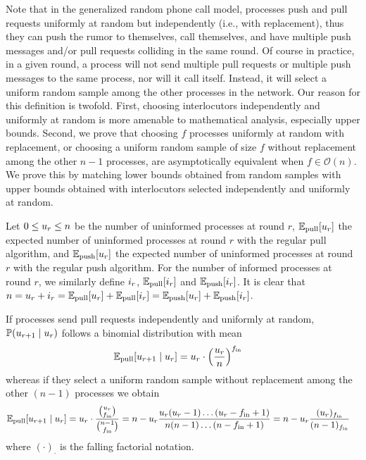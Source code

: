 Note that in the generalized random phone call model, processes push and pull requests uniformly at random but independently (i.e., with replacement), thus they can push the rumor to themselves, call themselves, and have multiple push messages and/or pull requests colliding in the same round. Of course in practice, in a given round, a process will not send multiple pull requests or multiple push messages to the same process, nor will it call itself. Instead, it will select a uniform random sample among the other processes in the network. Our reason for this definition is twofold. First, choosing interlocutors independently and uniformly at random is more amenable to mathematical analysis, especially upper bounds. Second, we prove that choosing $f$ processes uniformly at random with replacement, or choosing a uniform random sample of size $f$ without replacement among the other $n-1$ processes, are asymptotically equivalent when $f \in \mathcal{O}(n)$. We prove this by matching lower bounds obtained from random samples with upper bounds obtained with interlocutors selected independently and uniformly at random.
\begin{definition}
  Let $0 \leq u_{r} \leq n$ be the number of uninformed processes at round $r$,  $\mathbb{E}_{\text{pull}}[u_{r}]$ the expected number of uninformed processes at round $r$ with the regular pull algorithm, and $\mathbb{E}_{\text{push}}[u_{r}]$ the expected number of uninformed processes at round $r$ with the regular push algorithm. For the number of informed processes at round $r$, we similarly define $i_{r}$, $\mathbb{E}_{\text{pull}}[i_{r}]$ and $\mathbb{E}_{\text{push}}[i_{r}]$. It is clear that $n=u_{r}+i_{r}=\mathbb{E}_{\text{pull}}[u_{r}]+\mathbb{E}_{\text{pull}}[i_{r}]=\mathbb{E}_{\text{push}}[u_{r}]+\mathbb{E}_{\text{push}}[i_{r}]$.
\end{definition}
If processes send pull requests independently and uniformly at random, $\mathbb{P}(u_{r+1} \mid u_{r})$ follows a binomial distribution with mean
\begin{align}
  \label{eq:meanpull1}
  \mathbb{E}_\text{pull}[u_{r+1} \mid u_{r}]&=u_{r}\cdot\left(\frac{u_{r}}{n}\right)^{f_\text{in}}
\end{align}
whereas if they select a uniform random sample without replacement among the other $(n-1)$ processes we obtain
\begin{align}
  \label{eq:meanpull2}
  \mathbb{E}_\text{pull}[u_{r+1} \mid u_{r}]&=u_{r}\cdot\frac{{u_{r}\choose f_\text{in}}}{{n-1 \choose f_\text{in}}}=n-u_{r}\frac{u_{r}(u_{r}-1)\dots(u_{r}-f_\text{in}+1)}{n(n-1)\dots(n-f_\text{in}+1)} = n-u_{r} \frac{(u_{r})_{f_\text{in}}}{(n-1)_{f_\text{in}}} 
\end{align}
where $(\boldsymbol{\cdot})_{\boldsymbol{\cdot}} $ is the falling factorial notation.


